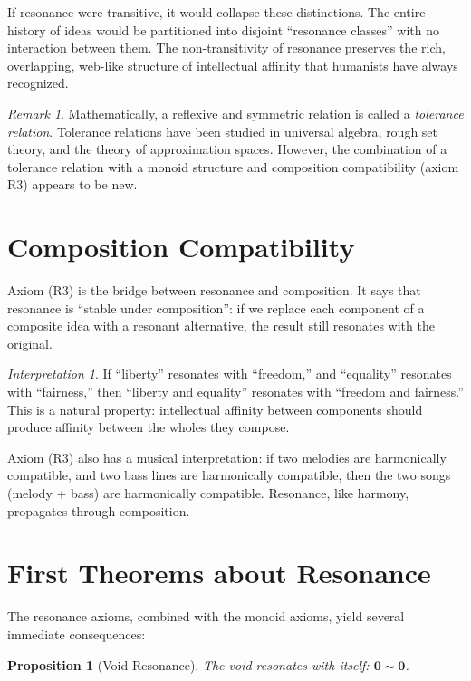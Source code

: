 \documentclass[11pt,openany]{book}
\theoremstyle{definition}
\theoremstyle{plain}
\newtheorem{proposition}[axiom]{Proposition}
\theoremstyle{remark}
\newtheorem{remark}[axiom]{Remark}
\newtheorem{interpretation}[axiom]{Interpretation}
\newcommand{\void}{\mathbf{0}}              %
\newcommand{\res}{\sim}                      %
\begin{document}
If resonance were transitive, it would collapse these distinctions. The entire history of ideas would be partitioned into disjoint ``resonance classes'' with no interaction between them. The non-transitivity of resonance preserves the rich, overlapping, web-like structure of intellectual affinity that humanists have always recognized.

\begin{remark}
Mathematically, a reflexive and symmetric relation is called a \emph{tolerance relation}. Tolerance relations have been studied in universal algebra, rough set theory, and the theory of approximation spaces. However, the combination of a tolerance relation with a monoid structure and composition compatibility (axiom R3) appears to be new.
\end{remark}

\section{Composition Compatibility}

Axiom (R3) is the bridge between resonance and composition. It says that resonance is ``stable under composition'': if we replace each component of a composite idea with a resonant alternative, the result still resonates with the original.

\begin{interpretation}
If ``liberty'' resonates with ``freedom,'' and ``equality'' resonates with ``fairness,'' then ``liberty and equality'' resonates with ``freedom and fairness.'' This is a natural property: intellectual affinity between components should produce affinity between the wholes they compose.

Axiom (R3) also has a musical interpretation: if two melodies are harmonically compatible, and two bass lines are harmonically compatible, then the two songs (melody + bass) are harmonically compatible. Resonance, like harmony, propagates through composition.
\end{interpretation}

\section{First Theorems about Resonance}

The resonance axioms, combined with the monoid axioms, yield several immediate consequences:

\begin{proposition}[Void Resonance]
\label{prop:void-resonance}
The void resonates with itself: $\void \res \void$.
\end{proposition}
\end{document}
